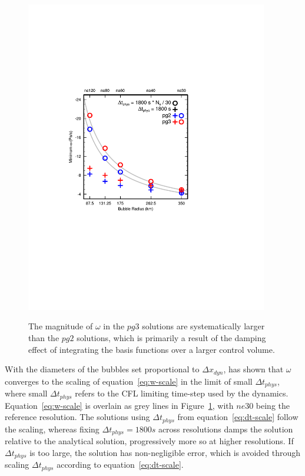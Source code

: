\documentclass{agujournal}
\begin{document}
\begin{figure}[t]
\begin{center}
\noindent\includegraphics[width=25pc,angle=0]{figs/bubble_test.pdf}\\
\end{center}
\caption{The magnitude of $\omega$ in the $pg3$ solutions are systematically larger than the $pg2$ solutions, which is primarily a result of the damping effect of integrating the basis functions over a larger control volume.}
\label{fig:bubble}
\end{figure}

With the diameters of the bubbles set proportional to $\Delta x_{dyn}$, \cite{HR2018JAMES} has shown that $\omega$ converges to the scaling of equation~\eqref{eq:w-scale} in the limit of small $\Delta t_{phys}$, where small $\Delta t_{phys}$ refers to the CFL limiting time-step used by the dynamics. Equation~\eqref{eq:w-scale} is overlain as grey lines in Figure~\ref{fig:bubble}, with $ne30$ being the reference resolution. The solutions using $\Delta t_{phys}$ from equation~\eqref{eq:dt-scale} follow the scaling, whereas fixing $\Delta t_{phys} = 1800s$ across resolutions damps the solution relative to the analytical solution, progressively more so at higher resolutions. If $\Delta t_{phys}$ is too large, the solution has non-negligible error, which is avoided through scaling $\Delta t_{phys}$ according to equation~\eqref{eq:dt-scale}.
\end{document}
